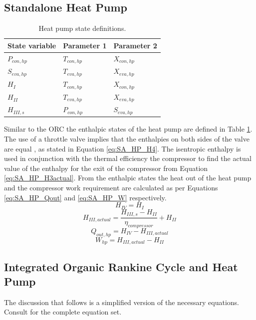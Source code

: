 \documentclass[a4paper,12pt]{article}
\begin{document}
\subsection{Standalone Heat Pump}
\begin{table}[H]
  \centering
  \caption{Heat pump state definitions.}
  \label{tab:SA_HP_states}
  \begin{tabular}{lll}
    \toprule
    State variable & Parameter 1 & Parameter 2 \\
    \midrule
    $P_{con,hp}$ & $T_{con,hp}$ & $X_{con,hp}$\\
    $S_{eva,hp}$ & $T_{eva,hp}$ & $X_{eva,hp}$\\
    $H_{I}$ & $T_{con,hp}$ & $X_{con,hp}$\\
    $H_{II}$ & $T_{eva,hp}$ & $X_{eva,hp}$\\
    $H_{III,s}$ & $P_{con,hp}$ & $S_{eva,hp}$\\
    \bottomrule
  \end{tabular}
\end{table}
Similar to the ORC the enthalpic states of the heat pump are defined in Table \ref{tab:SA_HP_states}. The use of a throttle valve implies that the enthalpies on both sides of the valve are equal \parencite{SmithVanNessAbbott}, as stated in Equation \ref{eq:SA_HP_H4}.  The isentropic enthalpy is used in conjunction with the thermal efficiency the compressor to find the actual value of the enthalpy for the exit of the compressor from Equation \ref{eq:SA_HP_H3actual}. From the enthalpic states the heat out of the heat pump and the compressor work requirement are calculated as per Equations \ref{eq:SA_HP_Qout} and \ref{eq:SA_HP_W} respectively.
\begin{equation}
    \label{eq:SA_HP_H4}
    H_{IV} = H_{I}
\end{equation}
\begin{equation}
    \label{eq:SA_HP_H3actual}
    H_{III,actual} = \frac{H_{III,s} - H_{II}}{\eta_{compressor}} + H_{II}
\end{equation}
\begin{equation}
    \label{eq:SA_HP_Qout}
    Q_{out,hp} = H_{IV} - H_{III,actual}
\end{equation}
\begin{equation}
    \label{eq:SA_HP_W}
    W_{hp} = H_{III,actual} - H_{II}
\end{equation}
\subsection{Integrated Organic Rankine Cycle and Heat Pump}
The discussion that follows is a simplified version of the necessary equations. Consult \textcite{YU2018330} for the complete equation set. 
\end{document}

